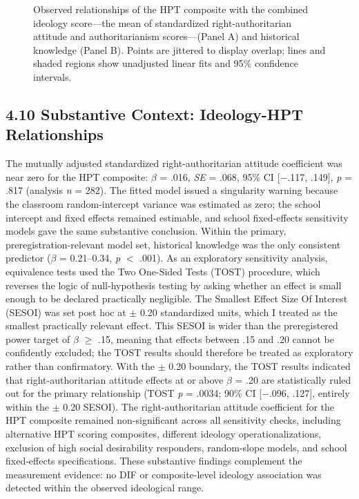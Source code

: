 \documentclass[PCJ,Unicode,screen,mode=plain]{cedram}
\begin{document}
\begin{figure}[htbp]
{
}
\caption{Observed relationships of the HPT composite with the combined ideology score---the mean of standardized right-authoritarian attitude and authoritarianism scores---(Panel A) and historical knowledge (Panel B). Points are jittered to display overlap; lines and shaded regions show unadjusted linear fits and 95\% confidence intervals.}
\label{fig:relationships}
\end{figure}

\subsection*{4.10 Substantive Context: Ideology-HPT Relationships}\label{substantive-context-ideology-hpt-relationships}

The mutually adjusted standardized right-authoritarian attitude coefficient
was near zero for the HPT composite: \(\beta\) = .016, \emph{SE} = .068, 95\%
CI [$-$.117, .149], \emph{p} = .817 (analysis \emph{n} = 282).
The fitted model issued a singularity warning because the classroom
random-intercept variance was estimated as zero; the school intercept and
fixed effects remained estimable, and school fixed-effects sensitivity models
gave the same substantive conclusion.
Within the primary, preregistration-relevant model set, historical knowledge
was the only consistent predictor (\(\beta\) = 0.21--0.34, \emph{p} $<$ .001).
As an exploratory sensitivity analysis, equivalence tests used the Two
One-Sided Tests (TOST) procedure, which reverses the logic of
null-hypothesis testing by asking whether an effect is small enough to
be declared practically negligible. The Smallest Effect Size Of
Interest (SESOI) was set post hoc at \(\pm\) 0.20 standardized units,
which I treated as the smallest practically relevant effect.
This SESOI is wider than the preregistered power target of \(\beta\)
\(\geq\) .15, meaning that effects between .15 and .20 cannot be
confidently excluded; the TOST results should therefore be treated as
exploratory rather than confirmatory. With the \(\pm\) 0.20 boundary,
the TOST results indicated that right-authoritarian attitude effects at
or above \(\beta\) = .20 are statistically ruled out for the primary
relationship (TOST \emph{p} = .0034; 90\% CI [$-$.096, .127], entirely
within the \(\pm\) 0.20 SESOI). The right-authoritarian attitude
coefficient for the HPT composite remained non-significant
across all sensitivity checks, including alternative HPT scoring
composites, different ideology operationalizations, exclusion of
high social desirability responders, random-slope models, and
school fixed-effects specifications. These substantive findings complement the measurement
evidence: no DIF or composite-level ideology
association was detected within the observed ideological range.
\end{document}
